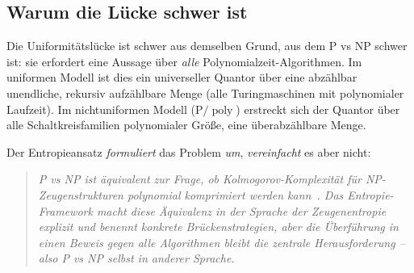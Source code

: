 \documentclass[aps,prd,twocolumn,superscriptaddress,nofootinbib]{revtex4-2}
\theoremstyle{definition}
\theoremstyle{remark}
\DeclareMathOperator{\poly}{poly}
\newcommand{\NP}{\mathrm{NP}}
\newcommand{\PP}{\mathrm{P}}
\begin{document}
\subsection{Warum die Lücke schwer ist}

Die Uniformitätslücke ist schwer aus demselben Grund, aus dem $\PP$ vs $\NP$ schwer ist: sie erfordert eine Aussage über \textit{alle} Polynomialzeit-Algorithmen. Im uniformen Modell ist dies ein universeller Quantor über eine abzählbar unendliche, rekursiv aufzählbare Menge (alle Turingmaschinen mit polynomialer Laufzeit). Im nichtuniformen Modell ($\PP/\poly$) erstreckt sich der Quantor über alle Schaltkreisfamilien polynomialer Größe, eine überabzählbare Menge.

Der Entropieansatz \textit{formuliert} das Problem \textit{um}, \textit{vereinfacht} es aber nicht:
\begin{quote}
\textit{P vs NP ist äquivalent zur Frage, ob Kolmogorov-Komplexität für NP-Zeugenstrukturen polynomial komprimiert werden kann~\cite{Fortnow2000}. Das Entropie-Framework macht diese Äquivalenz in der Sprache der Zeugenentropie explizit und benennt konkrete Brückenstrategien, aber die Überführung in einen Beweis gegen alle Algorithmen bleibt die zentrale Herausforderung -- also P vs NP selbst in anderer Sprache.}
\end{quote}
\end{document}
